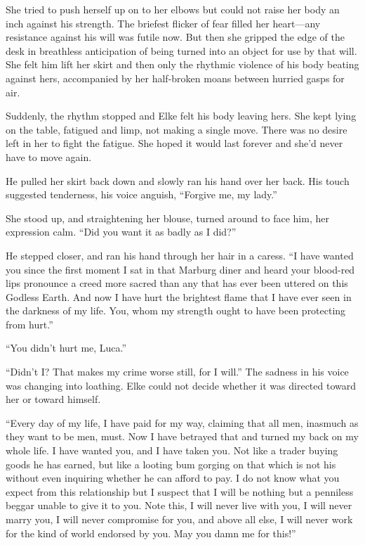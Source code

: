 She tried to push herself up on to her elbows but could not raise her body an inch against his strength. The briefest flicker of fear filled her heart---any resistance against his will was futile now. But then she gripped the edge of the desk in breathless anticipation of being turned into an object for use by that will. She felt him lift her skirt and then only the rhythmic violence of his body beating against hers, accompanied by her half-broken moans between hurried gasps for air.

Suddenly, the rhythm stopped and Elke felt his body leaving hers. She kept lying on the table, fatigued and limp, not making a single move. There was no desire left in her to fight the fatigue. She hoped it would last forever and she'd never have to move again.

He pulled her skirt back down and slowly ran his hand over her back. His touch suggested tenderness, his voice anguish, ``Forgive me, my lady.''

She stood up, and straightening her blouse, turned around to face him, her expression calm. ``Did you want it as badly as I did?''

He stepped closer, and ran his hand through her hair in a caress. ``I have wanted you since the first moment I sat in that Marburg diner and heard your blood-red lips pronounce a creed more sacred than any that has ever been uttered on this Godless Earth. And now I have hurt the brightest flame that I have ever seen in the darkness of my life. You, whom my strength ought to have been protecting from hurt.''

``You didn't hurt me, Luca.''

``Didn't I? That makes my crime worse still, for I will.'' The sadness in his voice was changing into loathing. Elke could not decide whether it was directed toward her or toward himself.

``Every day of my life, I have paid for my way, claiming that all men, inasmuch as they want to be men, must. Now I have betrayed that and turned my back on my whole life. I have wanted you, and I have taken you. Not like a trader buying goods he has earned, but like a looting bum gorging on that which is not his without even inquiring whether he can afford to pay. I do not know what you expect from this relationship but I suspect that I will be nothing but a penniless beggar unable to give it to you. Note this, I will never live with you, I will never marry you, I will never compromise for you, and above all else, I will never work for the kind of world endorsed by you. May you damn me for this!''

